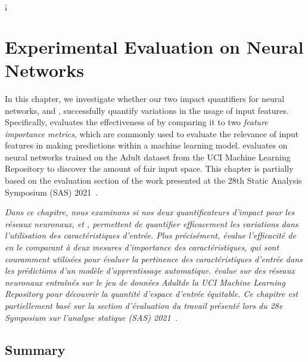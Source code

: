 \setchapterpreamble[u]{\margintoc}¡

\chapter{Experimental Evaluation on Neural Networks}

\marginemptybox{7cm}

In this chapter, we investigate whether our two impact quantifiers for neural networks, \cf{} \changesname{} and \qlibraname{}, successfully quantify variations in the usage of input features. Specifically,  evaluates the effectiveness of \changesname{} by comparing it to two \emph{feature importance metrics}, which are commonly used to evaluate the relevance of input features in making predictions within a machine learning model.  evaluates \qlibraname{} on neural networks trained on the Adult dataset from the UCI Machine Learning Repository to discover the amount of fair input space. This chapter is partially based on the evaluation section of the work presented at the 28th Static Analysis Symposium (SAS) 2021~.

\frenchdiv

\emph{
  Dans ce chapitre, nous examinons si nos deux quantificateurs d'impact pour les réseaux neuronaux, \cf{} \changesname{} et \qlibraname{}, permettent de quantifier efficacement les variations dans l'utilisation des caractéristiques d'entrée. Plus précisément,  évalue l'efficacité de \changesname{} en le comparant à deux \emph{mesures d'importance des caractéristiques}, qui sont couramment utilisées pour évaluer la pertinence des caractéristiques d'entrée dans les prédictions d'un modèle d'apprentissage automatique.  évalue \qlibraname{} sur des réseaux neuronaux entraînés sur le jeu de données Adult\sidenotemark[\ref{adult-url}] de la UCI Machine Learning Repository pour découvrir la quantité d'espace d'entrée équitable. Ce chapitre est partiellement basé sur la section d'évaluation du travail présenté lors du 28e Symposium sur l'analyse statique (SAS) 2021~\cite[Section 3]{Mazzucato2021}.
}







\section{Summary}

